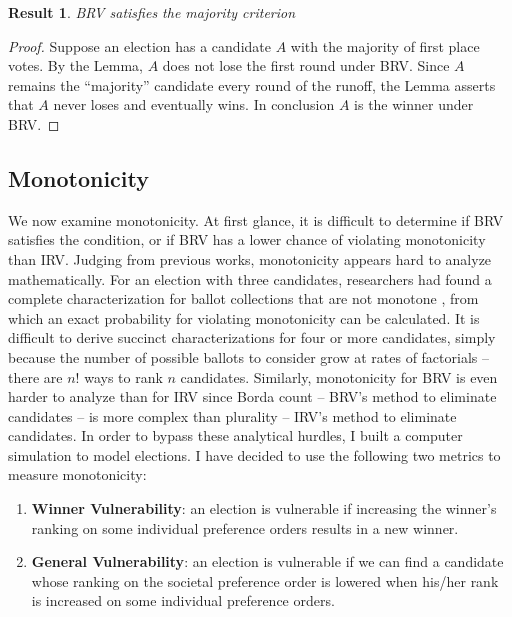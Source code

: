 \documentclass{article}
\newtheorem{res}{Result}
\begin{document}
\begin{res}
BRV satisfies the majority criterion
\end{res}

\begin{proof}
	Suppose an election has a candidate $A$ with the majority of first place votes. By the Lemma, $A$ does not lose the first round under BRV. Since $A$ remains the “majority” candidate every round of the runoff, the Lemma asserts that $A$ never loses and eventually wins. In conclusion $A$ is the winner under BRV.
\end{proof}

\subsection{Monotonicity}

We now examine monotonicity. At first glance, it is difficult to determine if BRV satisfies the condition, or if BRV has a lower chance of violating monotonicity than IRV. Judging from previous works, monotonicity appears hard to analyze mathematically. For an election with three candidates, researchers had found a complete characterization for ballot collections that are not monotone \cite{Research1}, from which an exact probability for violating monotonicity can be calculated. It is difficult to derive succinct characterizations for four or more candidates, simply because the number of possible ballots to consider grow at rates of factorials – there are $n!$ ways to rank $n$ candidates. Similarly, monotonicity for BRV is even harder to analyze than for IRV since Borda count – BRV’s method to eliminate candidates – is more complex than plurality – IRV’s method to eliminate candidates. In order to bypass these analytical hurdles, I built a computer simulation to model elections. I have decided to use the following two metrics to measure monotonicity:

\begin{enumerate}
	\item \textbf{Winner Vulnerability}: an election is vulnerable if increasing the winner’s ranking on some individual preference orders results in a new winner.
	\item \textbf{General Vulnerability}: an election is vulnerable if we can find a candidate whose ranking on the societal preference order is lowered when his/her rank is increased on some individual preference orders.
	
\end{enumerate}
\end{document}
